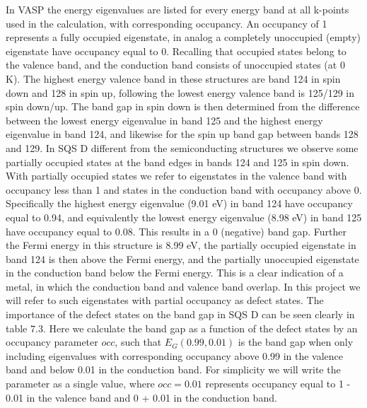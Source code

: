 In VASP the energy eigenvalues are listed for every energy band at all k-points used in the calculation, with corresponding occupancy. An occupancy of 1 represents a fully occupied eigenstate, in analog a completely unoccupied (empty) eigenstate have occupancy equal to 0. Recalling that occupied states belong to the valence band, and the conduction band consists of unoccupied states (at 0 K). The highest energy valence band in these structures are band 124 in spin down and 128 in spin up, following the lowest energy valence band is 125/129 in spin down/up. The band gap in spin down is then determined from the difference between the lowest energy eigenvalue in band 125 and the highest energy eigenvalue in band 124, and likewise for the spin up band gap between bands 128 and 129. In SQS D different from the semiconducting structures we observe some partially occupied states at the band edges in bands 124 and 125 in spin down. With partially occupied states we refer to eigenstates in the valence band with occupancy less than 1 and states in the conduction band with occupancy above 0. Specifically the highest energy eigenvalue (9.01 eV) in band 124 have occupancy equal to 0.94, and equivalently the lowest energy eigenvalue (8.98 eV) in band 125 have occupancy equal to 0.08. This results in a 0 (negative) band gap. Further the Fermi energy in this structure is 8.99 eV, the partially occupied eigenstate in band 124 is then above the Fermi energy, and the partially unoccupied eigenstate in the conduction band below the Fermi energy. This is a clear indication of a metal, in which the conduction band and valence band overlap. In this project we will refer to such eigenstates with partial occupancy as defect states. The importance of the defect states on the band gap in SQS D can be seen clearly in table 7.3. Here we calculate the band gap as a function of the defect states by an occupancy parameter $occ$, such that $E_G (0.99, 0.01)$ is the band gap when only including eigenvalues with corresponding occupancy above 0.99 in the valence band and below 0.01 in the conduction band. For simplicity we will write the parameter as a single value, where $occ = 0.01$ represents occupancy equal to 1 - 0.01 in the valence band and 0 + 0.01 in the conduction band.

